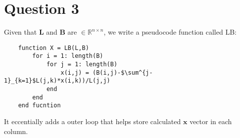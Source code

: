 \documentclass{article}
\newcommand{\mat}[1]{\mathbf{#1}}
\begin{document}
\section*{Question 3}
    
Given that $\mat{L}$ and $\mat{B}$ are $\in \mathbb{R}^{n \times n}$, we write
a pseudocode function called LB:
\begin{lstlisting}
    function X = LB(L,B)
        for i = 1: length(B)
            for j = 1: length(B)
                x(i,j) = (B(i,j)-$\sum^{j-1}_{k=1}$L(j,k)*x(i,k))/L(j,j)
            end
        end
    end fucntion
\end{lstlisting}
It eccentially adds a outer loop that helps store calculated $\mat{x}$ vector in each column. 
\end{document}
